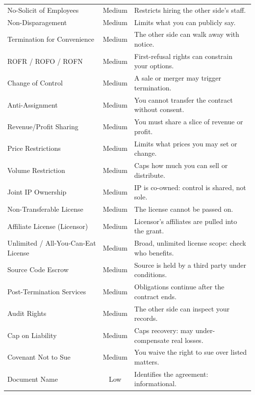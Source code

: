 \begin{longtable}{>{\raggedright\arraybackslash}p{4.6cm} c >{\raggedright\arraybackslash}p{7.6cm}}
No-Solicit of Employees & \textcolor{riskmed}{Medium} & Restricts hiring the other side's staff.\\
Non-Disparagement & \textcolor{riskmed}{Medium} & Limits what you can publicly say.\\
Termination for Convenience & \textcolor{riskmed}{Medium} & The other side can walk away with notice.\\
ROFR / ROFO / ROFN & \textcolor{riskmed}{Medium} & First-refusal rights can constrain your options.\\
Change of Control & \textcolor{riskmed}{Medium} & A sale or merger may trigger termination.\\
Anti-Assignment & \textcolor{riskmed}{Medium} & You cannot transfer the contract without consent.\\
Revenue/Profit Sharing & \textcolor{riskmed}{Medium} & You must share a slice of revenue or profit.\\
Price Restrictions & \textcolor{riskmed}{Medium} & Limits what prices you may set or change.\\
Volume Restriction & \textcolor{riskmed}{Medium} & Caps how much you can sell or distribute.\\
Joint IP Ownership & \textcolor{riskmed}{Medium} & IP is co-owned: control is shared, not sole.\\
Non-Transferable License & \textcolor{riskmed}{Medium} & The license cannot be passed on.\\
Affiliate License (Licensor) & \textcolor{riskmed}{Medium} & Licensor's affiliates are pulled into the grant.\\
Unlimited / All-You-Can-Eat License & \textcolor{riskmed}{Medium} & Broad, unlimited license scope: check who benefits.\\
Source Code Escrow & \textcolor{riskmed}{Medium} & Source is held by a third party under conditions.\\
Post-Termination Services & \textcolor{riskmed}{Medium} & Obligations continue after the contract ends.\\
Audit Rights & \textcolor{riskmed}{Medium} & The other side can inspect your records.\\
Cap on Liability & \textcolor{riskmed}{Medium} & Caps recovery: may under-compensate real losses.\\
Covenant Not to Sue & \textcolor{riskmed}{Medium} & You waive the right to sue over listed matters.\\
\midrule
Document Name & \textcolor{risklow}{Low} & Identifies the agreement: informational.\\

\end{longtable}

